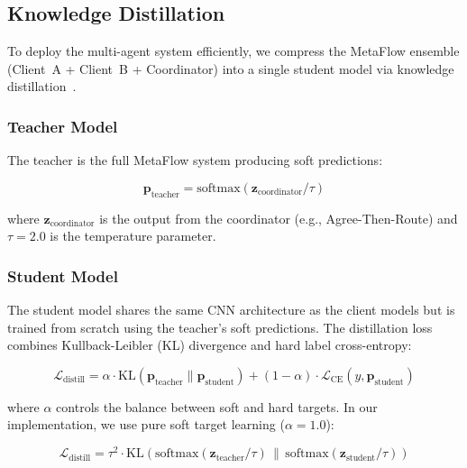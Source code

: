 \subsection{Knowledge Distillation}
\label{subsec:distillation}

To deploy the multi-agent system efficiently, we compress the MetaFlow ensemble (Client~A + Client~B + Coordinator) into a single student model via knowledge distillation~\cite{hinton2015distilling}.

\subsubsection{Teacher Model}

The teacher is the full MetaFlow system producing soft predictions:

\begin{equation}
\mathbf{p}_{\text{teacher}} = \text{softmax}(\mathbf{z}_{\text{coordinator}} / \tau)
\end{equation}

where $\mathbf{z}_{\text{coordinator}}$ is the output from the coordinator (e.g., Agree-Then-Route) and $\tau=2.0$ is the temperature parameter.

\subsubsection{Student Model}

The student model shares the same CNN architecture as the client models but is trained from scratch using the teacher's soft predictions. The distillation loss combines Kullback-Leibler (KL) divergence and hard label cross-entropy:

\begin{equation}
\mathcal{L}_{\text{distill}} = \alpha \cdot \text{KL}(\mathbf{p}_{\text{teacher}} \| \mathbf{p}_{\text{student}}) + (1-\alpha) \cdot \mathcal{L}_{\text{CE}}(y, \mathbf{p}_{\text{student}})
\end{equation}

where $\alpha$ controls the balance between soft and hard targets. In our implementation, we use pure soft target learning ($\alpha=1.0$):

\begin{equation}
\mathcal{L}_{\text{distill}} = \tau^2 \cdot \text{KL}\left(\text{softmax}(\mathbf{z}_{\text{teacher}}/\tau) \,\|\, \text{softmax}(\mathbf{z}_{\text{student}}/\tau)\right)
\end{equation}

